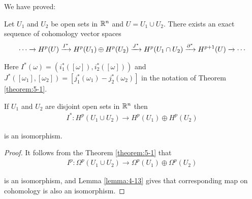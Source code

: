 We have proved:

\begin{theorem}\label{theorem:5-2}
Let $U_1$ and $U_2$ be open sets in $\mathbb{R}^n$ and $U = U_1\cup U_2$.
There exists an exact sequence of cohomology vector spaces
\begin{align*}
  \cdots\xrightarrow[]{}H^p(U)\xrightarrow[]{I^*}H^p(U_1)\oplus H^p(U_2)\xrightarrow[]{J^*}H^p(U_1\cap U_2)\xrightarrow[]{\partial^*}H^{p+1}(U)\xrightarrow[]{}\cdots
\end{align*}

Here $I^*(\omega) = (i^*_1([\omega]), i^*_2([\omega]))$ and $J^*([\omega_1], [\omega_2]) = [j^*_1(\omega_1) - j^*_2(\omega_2)]$
in the notation of Theorem \ref{theorem:5-1}.
\end{theorem}

\begin{corollary}\label{corollary:5-3}
  If $U_1$ and $U_2$ are disjoint open sets in $\mathbb{R}^n$ then
  \begin{align*}
    I^*:H^p(U_1\cup U_2)\to H^p(U_1)\oplus H^p(U_2)
  \end{align*}

  is an isomorphism.
\end{corollary}

\begin{proof}
  It follows from the Theorem \ref{theorem:5-1} that 
  \begin{align*}
    I^p:\Omega^p(U_1\cup U_2)\to\Omega^p(U_1)\oplus\Omega^p(U_2)
  \end{align*}

  is an isomorphism, and Lemma \ref{lemma:4-13} gives that corresponding map on cohomology is also an isomorphism.
\end{proof}

